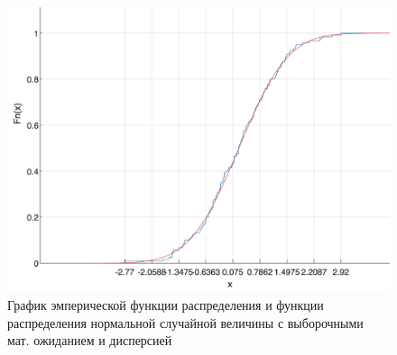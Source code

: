 \documentclass[12pt]{report}
\begin{document}
\begin{figure}[H]
	\begin{center}

		\includegraphics[scale=0.6]{./inc/img/f2.png}
			\caption{График эмперической функции распределения и функции распределения нормальной случайной величины с выборочными мат. ожиданием и дисперсией}
	\end{center}
	\label{img:eval}
\end{figure}
\end{document}
